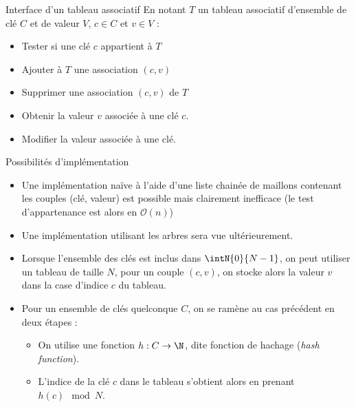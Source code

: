 \documentclass[10pt]{beamer}
\begin{document}
\begin{frame}[fragile]{\Ctitle}{\stitle}
	\begin{block}{Interface d'un tableau associatif}
		En notant $T$ un tableau associatif d'ensemble de clé $C$ et de valeur $V$,  $c \in C$ et $v \in V$ :
		\begin{itemize}
			\item<2-> Tester si une clé $c$ appartient à $T$
			\item<3-> Ajouter à $T$ une association $(c,v)$
			\item<4-> Supprimer une association $(c,v)$ de $T$
			\item<5-> Obtenir la valeur $v$ associée à une clé $c$.
			\item<6-> Modifier la valeur associée à une clé.
		\end{itemize}
	\end{block}
\end{frame}

\begin{frame}[fragile]{\Ctitle}{\stitle}
	\begin{block}{Possibilités d'implémentation}
		\begin{itemize}
			\item<1-> Une implémentation naïve à l'aide d'une liste chainée de maillons contenant les couples (clé, valeur) est possible mais clairement inefficace \onslide<2->(le test d'appartenance est alors en $\mathcal{O}(n)$)
			\item<3-> Une implémentation utilisant les arbres sera vue ultérieurement.
			\item<4-> Lorsque l'ensemble des clés est inclus dans $\intN{0}{N-1}$, on peut utiliser un tableau de taille $N$, pour un couple $(c,v)$, on stocke alors la valeur $v$ dans la case d'indice $c$ du tableau.
			\item<5-> Pour un ensemble de clés quelconque $C$, on se ramène au cas précédent en deux étapes :
				\begin{itemize}
					\item<6-> On utilise une fonction $h : C \rightarrow \N$, dite \textcolor{BrickRed}{fonction de hachage} (\textit{hash function}).
					\item<7-> L'indice de la clé $c$ dans le tableau s'obtient alors en prenant $h(c) \mod N$.
				\end{itemize}
		\end{itemize}
	\end{block}
\end{frame}
\end{document}
